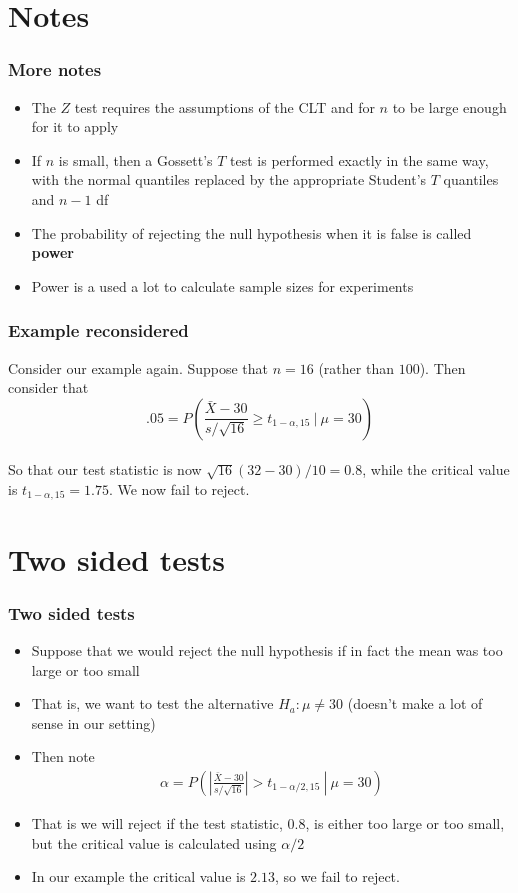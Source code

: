 \documentclass{beamer}
\begin{document}
\section{Notes}
\begin{frame}\frametitle{More notes}
\begin{itemize}
\item The $Z$ test requires the assumptions of the CLT and for $n$ to be large enough
  for it to apply
\item If $n$ is small, then a Gossett's $T$ test is performed exactly in the same way,
  with the normal quantiles replaced by the appropriate Student's $T$ quantiles and
  $n-1$ df
\item The probability of rejecting the null hypothesis when it is false is called {\bf power}
\item Power is a used a lot to calculate sample sizes for experiments
\end{itemize}
\end{frame} 


\begin{frame}\frametitle{Example reconsidered}
Consider our example again. Suppose that $n= 16$ (rather than
$100$). Then consider that \\
$$
.05 = P\left(\frac{\bar X - 30}{s / \sqrt{16}} \geq t_{1-\alpha, 15} ~|~ \mu = 30 \right)
$$ \ \\
So that our test statistic is now $\sqrt{16}(32 - 30) / 10 = 0.8 $, while the critical
value is $t_{1-\alpha, 15} = 1.75$. We now fail to reject.
\end{frame}

\section{Two sided tests}
\begin{frame}\frametitle{Two sided tests}
\begin{itemize}
\item Suppose that we would reject the null hypothesis if in fact the 
  mean was too large or too small
\item That is, we want to test the alternative $H_a : \mu \neq 30$
  (doesn't make a lot of sense in our setting)
\item Then note
  \begin{eqnarray*}
\alpha = P\left(\left. \left|\frac{\bar X - 30}{s /\sqrt{16}}\right| > t_{1-\alpha/2,15} ~\right|~ \mu = 30\right)
  \end{eqnarray*}
\item That is we will reject if the test statistic, $0.8$, is either
  too large or too small, but the critical value is calculated using
  $\alpha / 2$
\item In our example the critical value is $2.13$, so we fail to reject.
\end{itemize}
\end{frame}
\end{document}

